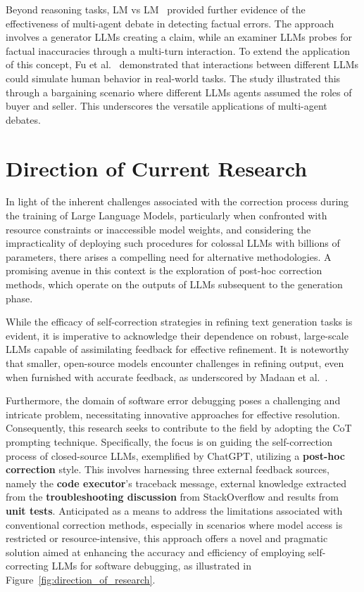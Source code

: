 \documentclass[a4paper,oneside]{book}
\begin{document}
Beyond reasoning tasks, LM vs LM~\cite{cohen2023lm} provided further evidence of the effectiveness of multi-agent debate in detecting factual errors. The approach involves a generator LLMs creating a claim, while an examiner LLMs probes for factual inaccuracies through a multi-turn interaction. To extend the application of this concept, Fu et al.~\cite{fu2023improving} demonstrated that interactions between different LLMs could simulate human behavior in real-world tasks. The study illustrated this through a bargaining scenario where different LLMs agents assumed the roles of buyer and seller. This underscores the versatile applications of multi-agent debates.

\section{Direction of Current Research}
In light of the inherent challenges associated with the correction process during the training of Large Language Models, particularly when confronted with resource constraints or inaccessible model weights, and considering the impracticality of deploying such procedures for colossal LLMs with billions of parameters, there arises a compelling need for alternative methodologies. A promising avenue in this context is the exploration of post-hoc correction methods, which operate on the outputs of LLMs subsequent to the generation phase.

While the efficacy of self-correction strategies in refining text generation tasks is evident, it is imperative to acknowledge their dependence on robust, large-scale LLMs capable of assimilating feedback for effective refinement. It is noteworthy that smaller, open-source models encounter challenges in refining output, even when furnished with accurate feedback, as underscored by Madaan et al.~\cite{madaan2023selfrefine}.

Furthermore, the domain of software error debugging poses a challenging and intricate problem, necessitating innovative approaches for effective resolution. Consequently, this research seeks to contribute to the field by adopting the CoT prompting technique. Specifically, the focus is on guiding the self-correction process of closed-source LLMs, exemplified by ChatGPT, utilizing a \textbf{post-hoc correction} style. This involves harnessing three external feedback sources, namely the \textbf{code executor}'s traceback message, external knowledge extracted from the \textbf{troubleshooting discussion} from StackOverflow and results from \textbf{unit tests}. Anticipated as a means to address the limitations associated with conventional correction methods, especially in scenarios where model access is restricted or resource-intensive, this approach offers a novel and pragmatic solution aimed at enhancing the accuracy and efficiency of employing self-correcting LLMs for software debugging, as illustrated in Figure~\ref{fig:direction_of_research}.
\end{document}
